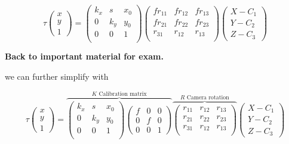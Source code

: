\documentclass[
  a4paper,
  ,captions=tableheading
]{scrartcl}
\begin{document}
\[
\tau \begin{pmatrix}
    x\\ y\\ 1
\end{pmatrix} = \begin{pmatrix}
    k_x & s & x_0 \\
    0 & k_y & y_0 \\
    0 & 0 & 1 \\
\end{pmatrix} \begin{pmatrix}
    fr_{11} & fr_{12} & fr_{13} \\
    fr_{21} & fr_{22} & fr_{23} \\
    r_{31} & r_{12} & r_{13} \\
\end{pmatrix} \begin{pmatrix}
    X-C_1\\ Y-C_2 \\ Z-C_3
\end{pmatrix}
\]

\textbf{Back to important material for exam.}

we can further simplify with

\[
\tau \begin{pmatrix}
    x\\ y\\ 1
\end{pmatrix} = \overbrace{\begin{pmatrix}
    k_x & s & x_0 \\
    0 & k_y & y_0 \\
    0 & 0 & 1 \\
\end{pmatrix} \begin{pmatrix}
    f & 0 & 0\\
    0 & f & 0\\
    0 & 0 & 1
\end{pmatrix}}^{K \text{ Calibration matrix}} \overbrace{\begin{pmatrix}
    r_{11} & r_{12} & r_{13} \\
    r_{21} & r_{22} & r_{23} \\
    r_{31} & r_{12} & r_{13} \\
\end{pmatrix}}^{R \text{ Camera rotation}} \begin{pmatrix}
    X-C_1\\ Y-C_2 \\ Z-C_3
\end{pmatrix}
\]
\end{document}

